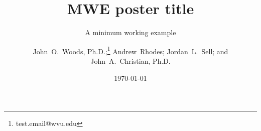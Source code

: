 \documentclass{beamer}
\title[MWE]{MWE poster title}
\subtitle{A minimum working example}
\author[Woods \& Christian]{John~O.~Woods, Ph.D.;\thanks{test.email@wvu.edu} Andrew~Rhodes; Jordan~L.~Sell; and John~A.~Christian, Ph.D.}
\institute[West Virginia University]{Department of Mechanical and Aerospace Engineering, West Virginia University}
\date{\today}
\makeatletter
\newcommand{\insertthanks}{\@thanks}
\makeatother
\begin{document}
\begin{frame}
    \insertauthor

    \insertthanks
\end{frame}
\end{document}
